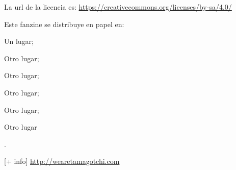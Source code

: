 \begin{flushleft}
La url de la licencia es: 
\url{https://creativecommons.org/licenses/by-sa/4.0/}

\vspace{1.0\baselineskip}

Este fanzine se distribuye en papel en:
\begin{linelist}
\item Un lugar;
\item Otro lugar;
\item Otro lugar;
\item Otro lugar;
\item Otro lugar;
\item Otro lugar
\end{linelist}.

\end{flushleft}

\vspace*{\fill}

\begin{flushright}\footnotesize
[+ info]\linebreak
\url{http://wearetamagotchi.com}
\end{flushright}

\rmfamily
\clearpage